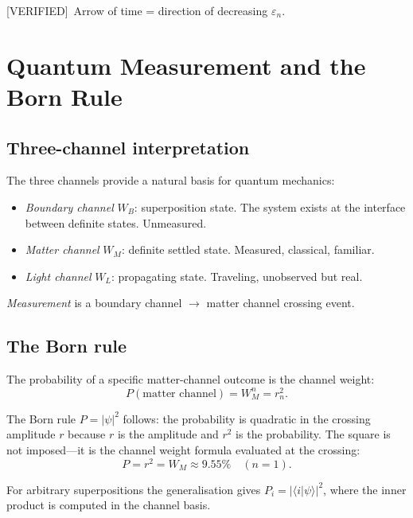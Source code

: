 \documentclass[prd,twocolumn,preprintnumbers,amsmath,amssymb]{revtex4-2}
\newcommand{\verified}{\textcolor{green!60!black}{[VERIFIED]}}
\begin{document}
\verified\ Arrow of time = direction of decreasing $\varepsilon_n$.

\section{Quantum Measurement and the Born Rule}
\label{sec:measurement}

\subsection{Three-channel interpretation}

The three channels provide a natural basis for quantum mechanics:
\begin{itemize}
  \item \emph{Boundary channel} $W_B$: superposition state.  The
        system exists at the interface between definite states.
        Unmeasured.
  \item \emph{Matter channel} $W_M$: definite settled state.
        Measured, classical, familiar.
  \item \emph{Light channel} $W_L$: propagating state.
        Traveling, unobserved but real.
\end{itemize}

\emph{Measurement} is a boundary channel $\to$ matter channel
crossing event.

\subsection{The Born rule}

The probability of a specific matter-channel outcome is the channel
weight:
\begin{equation}
  P(\text{matter channel}) = W_M^n = r_n^2.
  \label{eq:born}
\end{equation}

The Born rule $P = |\psi|^2$ follows: the probability is quadratic
in the crossing amplitude $r$ because $r$ is the amplitude and $r^2$
is the probability.  The square is not imposed---it is the channel
weight formula evaluated at the crossing:
\begin{equation}
  P = r^2 = W_M \approx 9.55\% \quad (n=1).
  \label{eq:born2}
\end{equation}

For arbitrary superpositions the generalisation gives
$P_i = |\langle i|\psi\rangle|^2$, where the inner product is
computed in the channel basis.
\end{document}
